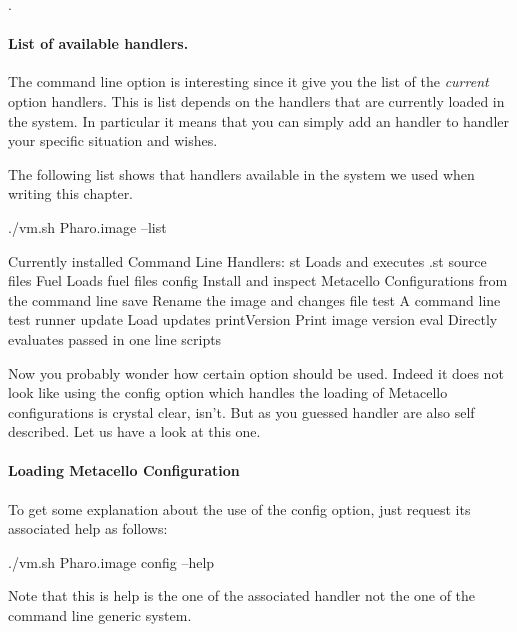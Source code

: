 \documentclass[a4paper,10pt,twoside]{book}
\begin{document}
.

\paragraph{List of available handlers.} The command line option  is interesting since it give you the list of the \emph{current} option handlers. This is list depends on the handlers that are currently loaded in the system. In particular it means that you can simply add an handler to handler your specific situation and wishes.

The following list shows that handlers available in the system we used when writing this chapter.

\begin{code}{}
./vm.sh Pharo.image --list

Currently installed Command Line Handlers:
    st              Loads and executes .st source files
    Fuel            Loads fuel files
    config          Install and inspect Metacello Configurations from the command line
    save            Rename the image and changes file
    test            A command line test runner
    update          Load updates
    printVersion    Print image version
    eval            Directly evaluates passed in one line scripts
\end{code}

Now you probably wonder how certain option should be used. Indeed it does not look like using the config option which handles the loading of Metacello configurations is crystal clear, isn't. But as you guessed handler are also self described. Let us have a look at this one. 



\paragraph{Loading Metacello Configuration}
To get some explanation about the use of the config option, just request its associated help as follows: 

\begin{code}{}
./vm.sh Pharo.image config --help
\end{code}

Note that this is help is the one of the associated handler not the one of the command line generic system. 
\end{document}
